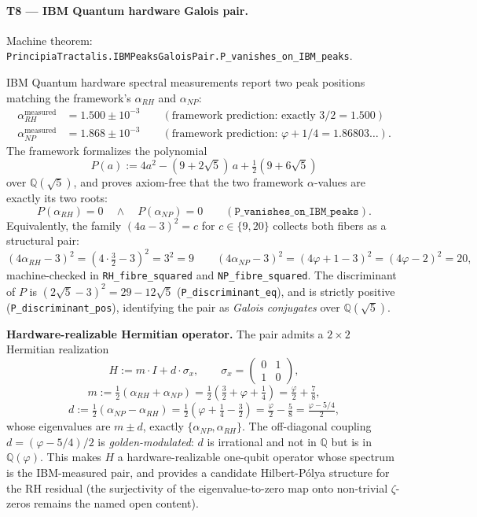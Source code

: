 \documentclass[11pt,a4paper]{article}
\theoremstyle{definition}
\begin{document}
\paragraph{T8 — IBM Quantum hardware Galois pair.}
\label{sec:t8}
Machine theorem:
\texttt{PrincipiaTractalis.IBMPeaksGaloisPair.P\_vanishes\_on\_IBM\_peaks}.

IBM Quantum hardware spectral measurements report two peak positions
matching the framework's $\alpha_{RH}$ and $\alpha_{NP}$:
\begin{align*}
\alpha_{RH}^{\text{measured}} &= 1.500 \pm 10^{-3}
\qquad (\text{framework prediction: exactly } 3/2 = 1.500) \\
\alpha_{NP}^{\text{measured}} &= 1.868 \pm 10^{-3}
\qquad (\text{framework prediction: } \varphi + 1/4 = 1.86803\ldots).
\end{align*}
The framework formalizes the polynomial
\[
P(a) := 4a^2 - (9 + 2\sqrt{5}) \, a + \tfrac{1}{2}(9 + 6\sqrt{5})
\]
over $\mathbb{Q}(\sqrt{5})$, and proves axiom-free that the two
framework $\alpha$-values are exactly its two roots:
\[
P(\alpha_{RH}) = 0 \quad \wedge \quad P(\alpha_{NP}) = 0
\qquad (\texttt{P\_vanishes\_on\_IBM\_peaks}).
\]
Equivalently, the family $(4a - 3)^2 = c$ for $c \in \{9, 20\}$
collects both fibers as a structural pair:
\[
(4 \alpha_{RH} - 3)^2 = (4 \cdot \tfrac{3}{2} - 3)^2 = 3^2 = 9
\qquad
(4 \alpha_{NP} - 3)^2 = (4\varphi + 1 - 3)^2 = (4\varphi - 2)^2 = 20,
\]
machine-checked in \texttt{RH\_fibre\_squared} and
\texttt{NP\_fibre\_squared}. The discriminant of $P$ is
$(2\sqrt{5} - 3)^2 = 29 - 12\sqrt{5}$
(\texttt{P\_discriminant\_eq}), and is strictly positive
(\texttt{P\_discriminant\_pos}), identifying the pair as
\emph{Galois conjugates} over $\mathbb{Q}(\sqrt{5})$.

\smallskip
\noindent\textbf{Hardware-realizable Hermitian operator.} The pair
admits a $2 \times 2$ Hermitian realization
\[
H := m \cdot I + d \cdot \sigma_x,
\qquad
\sigma_x = \begin{pmatrix} 0 & 1 \\ 1 & 0 \end{pmatrix},
\]
\[
m := \tfrac{1}{2}(\alpha_{RH} + \alpha_{NP}) = \tfrac{1}{2}(\tfrac{3}{2} + \varphi + \tfrac{1}{4})
= \tfrac{\varphi}{2} + \tfrac{7}{8},
\]
\[
d := \tfrac{1}{2}(\alpha_{NP} - \alpha_{RH}) = \tfrac{1}{2}(\varphi + \tfrac{1}{4} - \tfrac{3}{2})
= \tfrac{\varphi}{2} - \tfrac{5}{8} = \tfrac{\varphi - 5/4}{2},
\]
whose eigenvalues are $m \pm d$, exactly $\{\alpha_{NP}, \alpha_{RH}\}$.
The off-diagonal coupling $d = (\varphi - 5/4)/2$ is
\emph{golden-modulated}: $d$ is irrational and not in $\mathbb{Q}$
but is in $\mathbb{Q}(\varphi)$. This makes $H$ a hardware-realizable
one-qubit operator whose spectrum is the IBM-measured pair, and
provides a candidate Hilbert-P\'olya structure for the RH residual
(the surjectivity of the eigenvalue-to-zero map onto non-trivial
$\zeta$-zeros remains the named open content).
\end{document}
